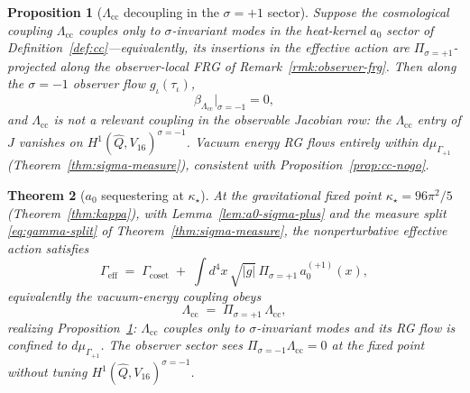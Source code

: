 \documentclass[aps,prd,onecolumn,amsmath,amssymb,nofootinbib,11pt]{revtex4-2}
\numberwithin{equation}{section}
\theoremstyle{plain}
\newtheorem{theorem}{Theorem}[section]
\newtheorem{proposition}[theorem]{Proposition}
\theoremstyle{definition}
\theoremstyle{remark}
\begin{document}
\begin{proposition}[$\Lambda_{\mathrm{cc}}$ decoupling in the $\sigma=+1$ sector]
\label{prop:cc-decouple}
Suppose the cosmological coupling $\Lambda_{\mathrm{cc}}$ couples only to
$\sigma$-invariant modes in the heat-kernel $a_0$ sector of
Definition~\ref{def:cc}---equivalently, its insertions in the effective
action are $\Pi_{\sigma=+1}$-projected along the observer-local FRG of
Remark~\ref{rmk:observer-frg}. Then along the $\sigma=-1$ observer flow
$g_\iota(\tau_\iota)$,
\begin{equation}\label{eq:beta-Lambda-decouple}
  \beta_{\Lambda_{\mathrm{cc}}}\Big|_{\sigma=-1}=0,
\end{equation}
and $\Lambda_{\mathrm{cc}}$ is not a relevant coupling in the observable
Jacobian row: the $\Lambda_{\mathrm{cc}}$ entry of $J$ vanishes on
$H^1(\hat Q,V_{16})^{\sigma=-1}$. Vacuum energy RG flows entirely within
$d\mu_{\Gamma_{+1}}$ (Theorem~\ref{thm:sigma-measure}), consistent with
Proposition~\ref{prop:cc-nogo}.
\end{proposition}

\begin{theorem}[$a_0$ sequestering at $\kappa_\star$]
\label{thm:cc-sequester}
At the gravitational fixed point $\kappa_\star=96\pi^2/5$
(Theorem~\ref{thm:kappa}), with Lemma~\ref{lem:a0-sigma-plus} and the
measure split \eqref{eq:gamma-split} of Theorem~\ref{thm:sigma-measure},
the nonperturbative effective action satisfies
\begin{equation}\label{eq:gamma-cc-eff-derived}
  \Gamma_{\mathrm{eff}}
  \;=\;
  \Gamma_{\mathrm{coset}}
  \;+\;
  \int d^4x\,\sqrt{|g|}\,
  \Pi_{\sigma=+1}\,a_0^{(+1)}(x),
\end{equation}
equivalently the vacuum-energy coupling obeys
\begin{equation}\label{eq:a0-sequester}
  \Lambda_{\mathrm{cc}}
  \;=\;
  \Pi_{\sigma=+1}\,\Lambda_{\mathrm{cc}},
\end{equation}
realizing Proposition~\ref{prop:cc-decouple}:
$\Lambda_{\mathrm{cc}}$ couples only to $\sigma$-invariant modes and its RG
flow is confined to $d\mu_{\Gamma_{+1}}$. The observer sector sees
$\Pi_{\sigma=-1}\Lambda_{\mathrm{cc}}=0$ at the fixed point without tuning
$H^1(\hat Q,V_{16})^{\sigma=-1}$.
\end{theorem}
\end{document}
